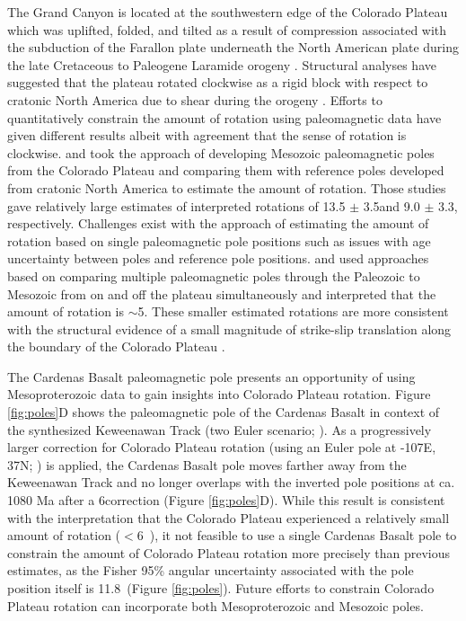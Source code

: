 The Grand Canyon is located at the southwestern edge of the Colorado Plateau which was uplifted, folded, and tilted as a result of compression associated with the subduction of the Farallon plate underneath the North American plate during the late Cretaceous to Paleogene Laramide orogeny \citep{Yonkee2015a, Karlstrom2012a, Timmons2012a, Karlstrom2022a}. Structural analyses have suggested that the plateau rotated clockwise as a rigid block with respect to cratonic North America due to shear during the orogeny \cite[e.g.][]{Hamilton1981a, Hamilton1988a}. Efforts to quantitatively constrain the amount of rotation using paleomagnetic data have given different results albeit with agreement that the sense of rotation is clockwise. \cite{Kent1993a} and \cite{Steiner2003a} took the approach of developing Mesozoic paleomagnetic poles from the Colorado Plateau and comparing them with reference poles developed from cratonic North America to estimate the amount of rotation. Those studies gave relatively large estimates of interpreted rotations of 13.5 $\pm$ 3.5\textdegree and 9.0 $\pm$ 3.3\textdegree, respectively. Challenges exist with the approach of estimating the amount of rotation based on single paleomagnetic pole positions such as issues with age uncertainty between poles and reference pole positions. \cite{Garza1998a} and \cite{Bryan1990a} used approaches based on comparing multiple paleomagnetic poles through the Paleozoic to Mesozoic from on and off the plateau simultaneously and interpreted that the amount of rotation is $\sim$5\textdegree. These smaller estimated rotations are more consistent with the structural evidence of a small magnitude of strike-slip translation along the boundary of the Colorado Plateau \cite[e.g.][]{Woodward1997a}. 

The Cardenas Basalt paleomagnetic pole presents an opportunity of using Mesoproterozoic data to gain insights into Colorado Plateau rotation. Figure \ref{fig:poles}D shows the paleomagnetic pole of the Cardenas Basalt in context of the synthesized Keweenawan Track (two Euler scenario; \cite{Swanson-Hysell2019a}). As a progressively larger correction for Colorado Plateau rotation (using an Euler pole at -107\textdegree E, 37\textdegree N; \cite{Bryan1990a}) is applied, the Cardenas Basalt pole moves farther away from the Keweenawan Track and no longer overlaps with the inverted pole positions at ca. 1080 Ma after a 6\textdegree correction (Figure \ref{fig:poles}D). While this result is consistent with the interpretation that the Colorado Plateau experienced a relatively small amount of rotation ($<$6\textdegree\ ), it not feasible to use a single Cardenas Basalt pole to constrain the amount of Colorado Plateau rotation more precisely than previous estimates, as the Fisher 95\% angular uncertainty associated with the pole position itself is 11.8\textdegree\ (Figure \ref{fig:poles}). Future efforts to constrain Colorado Plateau rotation can incorporate both Mesoproterozoic and Mesozoic poles.

